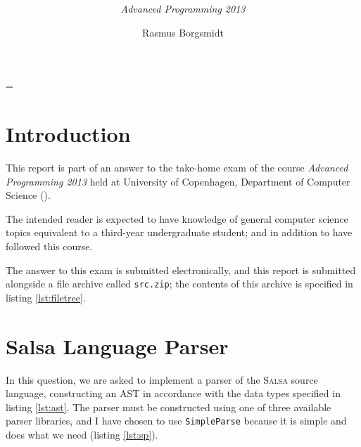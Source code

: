 \documentclass[
paper=a4,
oneside,
fontsize=11pt,
numbers=noenddot,
headinclude=false, %
footinclude=false, %
fleqn,             %
DIV=8
]{scrartcl}
\DeclareRobustCommand{\spacedlowsmallcaps}[1]{\MakeTextLowercase{\textsc{\lowsmallcapsspacing{#1}}}}%
\let\lstlistoflistings\listoflistings%
\begin{document}
\title{\textcolor{spot}{\rmfamily\mdseries\spacedlowsmallcaps{Exam Report}}}
\subtitle{\rmfamily\mdseries\itshape\normalsize{Advanced Programming 2013}}
\author{\large Rasmus Borgsmidt}
\date{}
\vspace{-30pt}\maketitle
{}
\setcounter{tocdepth}{2} %
\manualmark
\vspace{-30pt}\tableofcontents

\lstlistoflistings

\listoftables

\font%
\font%
\font=\font%

\clearpage
\section*{Introduction}

This report is part of an answer to the take-home exam of the course {\em
  Advanced Programming 2013} held at University of Copenhagen, Department of
Computer Science ().

The intended reader is expected to have knowledge of general computer
science topics equivalent to a third-year undergraduate student; and in addition
to have followed this course.

The answer to this exam is submitted electronically, and this report is
submitted alongside a file archive called {\tt src.zip}; the contents of this
archive is specified in listing \ref{lst:filetree}.

\section{Salsa Language Parser}

In this question, we are asked to implement a parser of the {\scshape Salsa}
source language, constructing an \ac{AST} in accordance with the data types
specified in listing \ref{lst:ast}. The parser must be constructed using one of
three available parser libraries, and I have chosen to use {\tt SimpleParse}
because it is simple and does what we need (listing \ref{lst:sp}).
\end{document}
